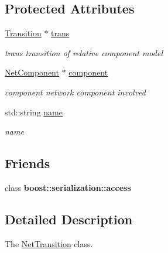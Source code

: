 \subsection*{Protected Attributes}
\begin{DoxyCompactItemize}
\item 
\hyperlink{class_transition}{Transition} $\ast$ \hyperlink{class_net_transition_ae3b12deb593dab99666592a3686bab9f}{trans}\hypertarget{class_net_transition_ae3b12deb593dab99666592a3686bab9f}{}\label{class_net_transition_ae3b12deb593dab99666592a3686bab9f}

\begin{DoxyCompactList}\small\item\em trans transition of relative component model \end{DoxyCompactList}\item 
\hyperlink{class_net_component}{Net\+Component} $\ast$ \hyperlink{class_net_transition_ac66eef3e787502efbb61baba213b737d}{component}\hypertarget{class_net_transition_ac66eef3e787502efbb61baba213b737d}{}\label{class_net_transition_ac66eef3e787502efbb61baba213b737d}

\begin{DoxyCompactList}\small\item\em component network component involved \end{DoxyCompactList}\item 
std\+::string \hyperlink{class_net_transition_ad2f59243faa110d4a9f887ed791f404d}{name}\hypertarget{class_net_transition_ad2f59243faa110d4a9f887ed791f404d}{}\label{class_net_transition_ad2f59243faa110d4a9f887ed791f404d}

\begin{DoxyCompactList}\small\item\em name \end{DoxyCompactList}\end{DoxyCompactItemize}
\subsection*{Friends}
\begin{DoxyCompactItemize}
\item 
class {\bfseries boost\+::serialization\+::access}\hypertarget{class_net_transition_ac98d07dd8f7b70e16ccb9a01abf56b9c}{}\label{class_net_transition_ac98d07dd8f7b70e16ccb9a01abf56b9c}

\end{DoxyCompactItemize}


\subsection{Detailed Description}
The \hyperlink{class_net_transition}{Net\+Transition} class. 

